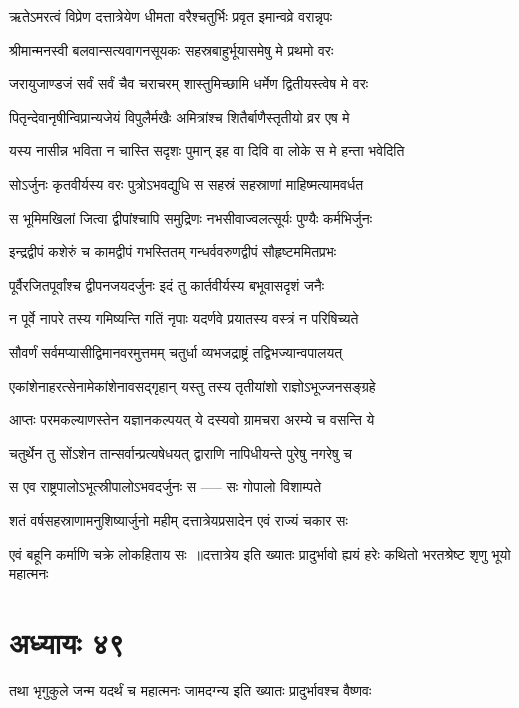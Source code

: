 \twolineshloka
{ऋतेऽमरत्वं विप्रेण दत्तात्रेयेण धीमता}
{वरैश्चतुर्भिः प्रवृत इमान्वव्रे वरान्नृपः}


\twolineshloka
{श्रीमान्मनस्वी बलवान्सत्यवागनसूयकः}
{सहस्रबाहुर्भूयासमेषु मे प्रथमो वरः}


\twolineshloka
{जरायुजाण्डजं सर्वं सर्वं चैव चराचरम्}
{शास्तुमिच्छामि धर्मेण द्वितीयस्त्वेष मे वरः}


\twolineshloka
{पितृन्देवानृषीन्विप्रान्यजेयं विपुलैर्मखैः}
{अमित्रांश्च शितैर्बाणैस्तृतीयो व्रर एष मे}


\twolineshloka
{यस्य नासीन्न भविता न चास्ति सदृशः पुमान्}
{इह वा दिवि वा लोके स मे हन्ता भवेदिति}


\twolineshloka
{सोऽर्जुनः कृतवीर्यस्य वरः पुत्रोऽभवद्युधि}
{स सहस्रं सहस्राणां माहिष्मत्यामवर्धत}


\twolineshloka
{स भूमिमखिलां जित्वा द्वीपांश्चापि समुद्रिणः}
{नभसीवाज्वलत्सूर्यः पुण्यैः कर्मभिर्जुनः}


\twolineshloka
{इन्द्रद्वीपं कशेरुं च कामद्वीपं गभस्तितम्}
{गन्धर्ववरुणद्वीपं सौहृष्टममितप्रभः}


\twolineshloka
{पूर्वैरजितपूर्वांश्च द्वीपनजयदर्जुनः}
{इदं तु कार्तवीर्यस्य बभूवासदृशं जनैः}


\twolineshloka
{न पूर्वे नापरे तस्य गमिष्यन्ति गतिं नृपाः}
{यदर्णवे प्रयातस्य वस्त्रं न परिषिच्यते}


\twolineshloka
{सौवर्णं सर्वमप्यासीद्विमानवरमुत्तमम्}
{चतुर्धा व्यभजद्राष्ट्रं तद्विभज्यान्वपालयत्}


\twolineshloka
{एकांशेनाहरत्सेनामेकांशेनावसद्गृहान्}
{यस्तु तस्य तृतीयांशो राज्ञोऽभूज्जनसङ्ग्रहे}


\twolineshloka
{आप्तः परमकल्याणस्तेन यज्ञानकल्पयत्}
{ये दस्यवो ग्रामचरा अरम्ये च वसन्ति ये}


\twolineshloka
{चतुर्थेन तु सोंऽशेन तान्सर्वान्प्रत्यषेधयत्}
{द्वाराणि नापिधीयन्ते पुरेषु नगरेषु च}


\twolineshloka
{स एव राष्ट्रपालोऽभूत्स्रीपालोऽभवदर्जुनः}
{स ----- सः गोपालो विशाम्पते}


\twolineshloka
{शतं वर्षसहस्राणामनुशिष्यार्जुनो महीम्}
{दत्तात्रेयप्रसादेन एवं राज्यं चकार सः}


\twolineshloka
{एवं बहूनि कर्माणि चक्रे लोकहिताय सः ॥दत्तात्रेय इति ख्यातः प्रादुर्भावो ह्ययं हरेः}
{कथितो भरतश्रेष्ट शृणु भूयो महात्मनः}


\chapter{अध्यायः ४९}
\twolineshloka
{तथा भृगुकुले जन्म यदर्थं च महात्मनः}
{जामदग्न्य इति ख्यातः प्रादुर्भावश्च वैष्णवः}



